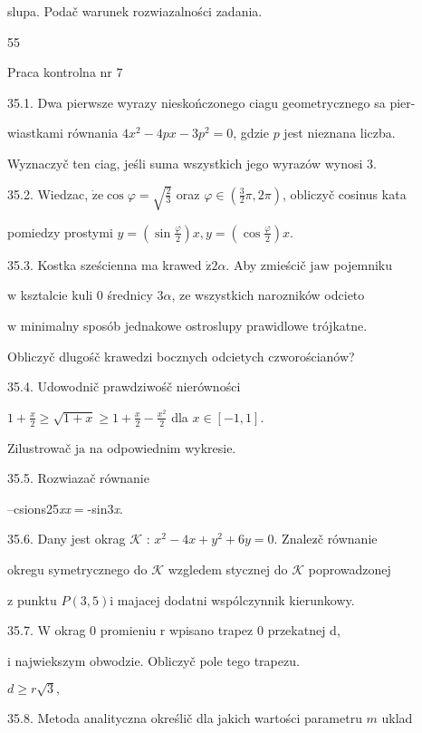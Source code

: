 \documentclass[a4paper,12pt]{article}
\begin{document}
slupa. Podač warunek rozwiazalności zadania.





55

Praca kontrolna nr 7

35.1. Dwa pierwsze wyrazy nieskończonego ciagu geometrycznego sa pier-

wiastkami równania $4x^{2}-4px-3p^{2}=0$, gdzie $p$ jest nieznana liczba.

Wyznaczyč ten ciag, jeśli suma wszystkich jego wyrazów wynosi 3.

35.2. Wiedzac, $\dot{\mathrm{z}}\mathrm{e} \cos\varphi=\sqrt{\frac{2}{3}}$ oraz $\varphi\in (\displaystyle \frac{3}{2}\pi,2\pi)$, obliczyč cosinus kata

pomiedzy prostymi $y= (\displaystyle \sin\frac{\varphi}{2})x, y= (\displaystyle \cos\frac{\varphi}{2})x.$

35.3. Kostka sześcienna ma krawed $\acute{\mathrm{z}}  2\alpha$. Aby zmieścič $\mathrm{j}\mathrm{a}\mathrm{w}$ pojemniku

$\mathrm{w}$ ksztalcie kuli $0$ średnicy $ 3\alpha$, ze wszystkich narozników odcieto

$\mathrm{w}$ minimalny sposób jednakowe ostroslupy prawidlowe trójkatne.

Obliczyč dlugośč krawedzi bocznych odcietych czworościanów?

35.4. Udowodnič prawdziwośč nierówności

$1+\displaystyle \frac{x}{2}\geq\sqrt{1+x}\geq 1+\frac{x}{2}-\frac{x^{2}}{2}$ dla $x\in[-1,1].$

Zilustrowač $\mathrm{j}\mathrm{a}$ na odpowiednim wykresie.

35.5. Rozwiazač równanie

--csions25{\it xx}$=$-sin3{\it x}.

35.6. Dany jest okrag $\mathcal{K}$ : $x^{2}-4x+y^{2}+6y = 0$. Znalez$\acute{}$č równanie

okregu symetrycznego do $\mathcal{K}$ wzgledem stycznej do $\mathcal{K}$ poprowadzonej

$\mathrm{z}$ punktu $P(3,5)\mathrm{i}$ majacej dodatni wspólczynnik kierunkowy.

35.7. W okrag 0 promieniu r wpisano trapez 0 przekatnej d,

i najwiekszym obwodzie. Obliczyč pole tego trapezu.

$ d\geq r\sqrt{3},$

35.8. Metoda analityczna określič dla jakich wartości parametru $m$ uklad
\end{document}
